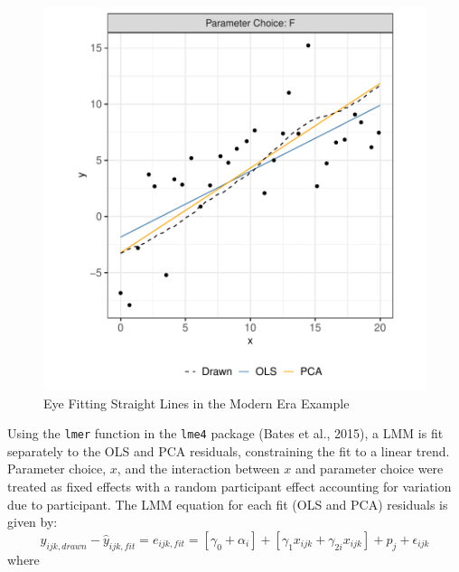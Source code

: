\documentclass[print]{nuthesis}
\begin{document}
\begin{figure}[tbp]

{\centering \includegraphics[width=1\linewidth,]{thesis_files/figure-latex/eyefitting-example-plot-1} 

}

\caption{Eye Fitting Straight Lines in the Modern Era Example}\label{fig:eyefitting-example-plot}
\end{figure}

Using the \texttt{lmer} function in the \texttt{lme4} package (Bates et al., 2015), a LMM is fit separately to the OLS and PCA residuals, constraining the fit to a linear trend.
Parameter choice, \(x\), and the interaction between \(x\) and parameter choice were treated as fixed effects with a random participant effect accounting for variation due to participant.
The LMM equation for each fit (OLS and PCA) residuals is given by:
\begin{equation}
y_{ijk,drawn} - \hat y_{ijk,fit} = e_{ijk,fit} = \left[\gamma_0 + \alpha_i\right] + \left[\gamma_{1} x_{ijk} + \gamma_{2i} x_{ijk}\right] + p_{j} + \epsilon_{ijk}
\end{equation}
\noindent where
\end{document}
